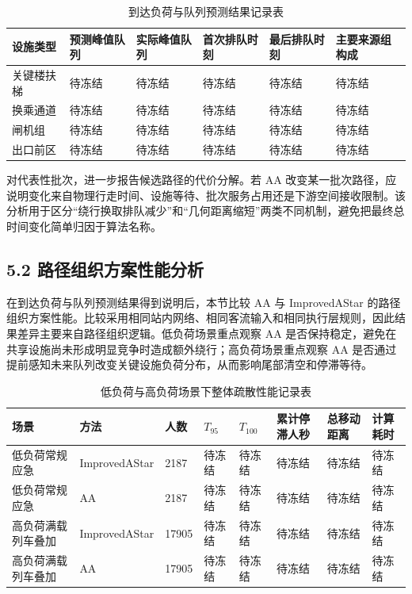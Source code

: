 \documentclass[UTF8,a4paper,12pt]{ctexart}
\begin{document}
\begin{table}[htbp]
\centering
\caption{到达负荷与队列预测结果记录表}
\small
\begin{tabular}{p{}p{}p{}p{}p{}p{}}
\toprule
设施类型 & 预测峰值队列 & 实际峰值队列 & 首次排队时刻 & 最后排队时刻 & 主要来源组构成 \\
\midrule
关键楼扶梯 & 待冻结 & 待冻结 & 待冻结 & 待冻结 & 待冻结 \\
换乘通道 & 待冻结 & 待冻结 & 待冻结 & 待冻结 & 待冻结 \\
闸机组 & 待冻结 & 待冻结 & 待冻结 & 待冻结 & 待冻结 \\
出口前区 & 待冻结 & 待冻结 & 待冻结 & 待冻结 & 待冻结 \\
\bottomrule
\end{tabular}
\end{table}

对代表性批次，进一步报告候选路径的代价分解。若 AA 改变某一批次路径，应说明变化来自物理行走时间、设施等待、批次服务占用还是下游空间接收限制。该分析用于区分“绕行换取排队减少”和“几何距离缩短”两类不同机制，避免把最终总时间变化简单归因于算法名称。

\subsection{5.2 路径组织方案性能分析}

在到达负荷与队列预测结果得到说明后，本节比较 AA 与 ImprovedAStar 的路径组织方案性能。比较采用相同站内网络、相同客流输入和相同执行层规则，因此结果差异主要来自路径组织逻辑。低负荷场景重点观察 AA 是否保持稳定，避免在共享设施尚未形成明显竞争时造成额外绕行；高负荷场景重点观察 AA 是否通过提前感知未来队列改变关键设施负荷分布，从而影响尾部清空和停滞等待。

\begin{table}[htbp]
\centering
\caption{低负荷与高负荷场景下整体疏散性能记录表}
\small
\begin{tabular}{p{}p{}p{}p{}p{}p{}p{}p{}}
\toprule
场景 & 方法 & 人数 & \(T_{95}\) & \(T_{100}\) & 累计停滞人秒 & 总移动距离 & 计算耗时 \\
\midrule
低负荷常规应急 & ImprovedAStar & 2187 & 待冻结 & 待冻结 & 待冻结 & 待冻结 & 待冻结 \\
低负荷常规应急 & AA & 2187 & 待冻结 & 待冻结 & 待冻结 & 待冻结 & 待冻结 \\
高负荷满载列车叠加 & ImprovedAStar & 17905 & 待冻结 & 待冻结 & 待冻结 & 待冻结 & 待冻结 \\
高负荷满载列车叠加 & AA & 17905 & 待冻结 & 待冻结 & 待冻结 & 待冻结 & 待冻结 \\
\bottomrule
\end{tabular}
\end{table}
\end{document}
